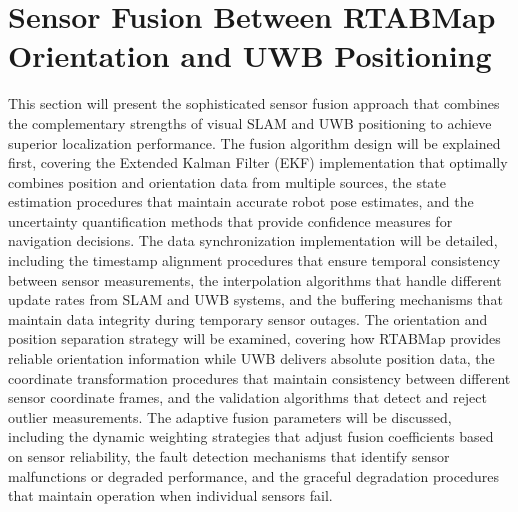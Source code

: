 \section{Sensor Fusion Between RTABMap Orientation and UWB Positioning}
This section will present the sophisticated sensor fusion approach that combines the complementary strengths of visual SLAM and UWB positioning to achieve superior localization performance. The fusion algorithm design will be explained first, covering the Extended Kalman Filter (EKF) implementation that optimally combines position and orientation data from multiple sources, the state estimation procedures that maintain accurate robot pose estimates, and the uncertainty quantification methods that provide confidence measures for navigation decisions. The data synchronization implementation will be detailed, including the timestamp alignment procedures that ensure temporal consistency between sensor measurements, the interpolation algorithms that handle different update rates from SLAM and UWB systems, and the buffering mechanisms that maintain data integrity during temporary sensor outages. The orientation and position separation strategy will be examined, covering how RTABMap provides reliable orientation information while UWB delivers absolute position data, the coordinate transformation procedures that maintain consistency between different sensor coordinate frames, and the validation algorithms that detect and reject outlier measurements. The adaptive fusion parameters will be discussed, including the dynamic weighting strategies that adjust fusion coefficients based on sensor reliability, the fault detection mechanisms that identify sensor malfunctions or degraded performance, and the graceful degradation procedures that maintain operation when individual sensors fail.

